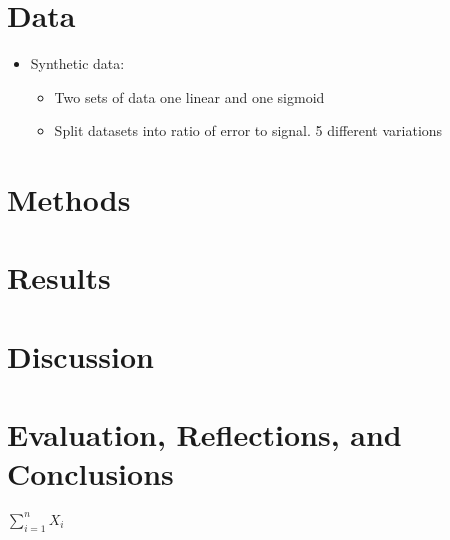 \documentclass[]{article}
\providecommand{\tightlist}{%
  \setlength{\itemsep}{0pt}\setlength{\parskip}{0pt}}
\begin{document}
\hypertarget{data}{%
\section{Data}\label{data}}

\begin{itemize}
\tightlist
\item
  Synthetic data:

  \begin{itemize}
  \tightlist
  \item
    Two sets of data one linear and one sigmoid
  \item
    Split datasets into ratio of error to signal. 5 different variations
  \end{itemize}
\end{itemize}

\hypertarget{methods}{%
\section{Methods}\label{methods}}

\hypertarget{results}{%
\section{Results}\label{results}}

\hypertarget{discussion}{%
\section{Discussion}\label{discussion}}

\hypertarget{evaluation-reflections-and-conclusions}{%
\section{Evaluation, Reflections, and
Conclusions}\label{evaluation-reflections-and-conclusions}}

\(\sum_{i=1}^n X_i\)
\end{document}

